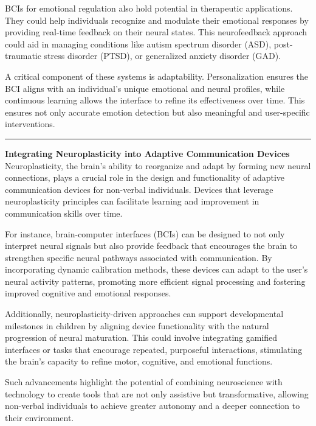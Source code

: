 \documentclass[12pt, research paper]{report}
\begin{document}
	 \noindent BCIs for emotional regulation also hold potential in therapeutic applications. They could help individuals recognize and modulate their emotional responses by providing real-time feedback on their neural states. This neurofeedback approach could aid in managing conditions like autism spectrum disorder (ASD), post-traumatic stress disorder (PTSD), or generalized anxiety disorder (GAD).
	\bigskip 
	
	\noindent A critical component of these systems is adaptability. Personalization ensures the BCI aligns with an individual’s unique emotional and neural profiles, while continuous learning allows the interface to refine its effectiveness over time. This ensures not only accurate emotion detection but also meaningful and user-specific interventions.
	
	\noindent \rule{13.85cm}{0.01cm}
	\textbf{Integrating Neuroplasticity into Adaptive Communication Devices}
	\newline Neuroplasticity, the brain’s ability to reorganize and adapt by forming new neural connections, plays a crucial role in the design and functionality of adaptive communication devices for non-verbal individuals. Devices that leverage neuroplasticity principles can facilitate learning and improvement in communication skills over time.
	\bigskip 
	
	\noindent For instance, brain-computer interfaces (BCIs) can be designed to not only interpret neural signals but also provide feedback that encourages the brain to strengthen specific neural pathways associated with communication. By incorporating dynamic calibration methods, these devices can adapt to the user’s neural activity patterns, promoting more efficient signal processing and fostering improved cognitive and emotional responses.
	\bigskip 
	
	\noindent Additionally, neuroplasticity-driven approaches can support developmental milestones in children by aligning device functionality with the natural progression of neural maturation. This could involve integrating gamified interfaces or tasks that encourage repeated, purposeful interactions, stimulating the brain’s capacity to refine motor, cognitive, and emotional functions.
	\bigskip 
	
	\noindent Such advancements highlight the potential of combining neuroscience with technology to create tools that are not only assistive but transformative, allowing non-verbal individuals to achieve greater autonomy and a deeper connection to their environment.
	
\end{document}
